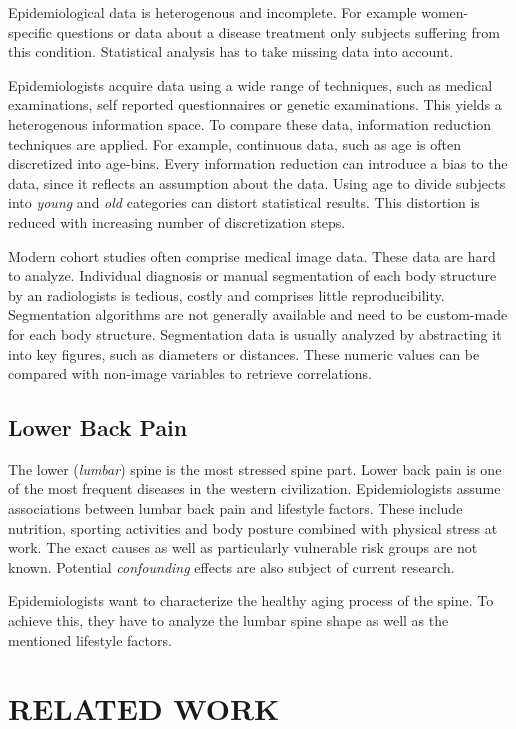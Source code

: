 \documentclass[a4paper,twoside]{style/article}
\begin{document}
Epidemiological data is heterogenous and incomplete.
For example women-specific questions or data about a disease treatment only subjects suffering from this condition.
Statistical analysis has to take missing data into account.

Epidemiologists acquire data using a wide range of techniques, such as medical examinations, self reported questionnaires or genetic examinations.
This yields a heterogenous information space.
To compare these data, information reduction techniques are applied.
For example, continuous data, such as age is often discretized into age-bins.
Every information reduction can introduce a bias to the data, since it reflects an assumption about the data.
Using age to divide subjects into \emph{young} and \emph{old} categories can distort statistical results.
This distortion is reduced with increasing number of discretization steps.

Modern cohort studies often comprise medical image data.
These data are hard to analyze.
Individual diagnosis or manual segmentation of each body structure by an radiologists is tedious, costly and comprises little reproducibility.
Segmentation algorithms are not generally available and need to be custom-made for each body structure.
Segmentation data is usually analyzed by abstracting it into key figures, such as diameters or distances.
These numeric values can be compared with non-image variables to retrieve correlations.
\subsection{Lower Back Pain}
The lower (\emph{lumbar}) spine is the most stressed spine part.
Lower back pain is one of the most frequent diseases in the western civilization.
Epidemiologists assume associations between lumbar back pain and lifestyle factors.
These include nutrition, sporting activities and body posture combined with physical stress at work.
The exact causes as well as particularly vulnerable risk groups are not known.
Potential \emph{confounding} effects are also subject of current research.

Epidemiologists want to characterize the healthy aging process of the spine.
To achieve this, they have to analyze the lumbar spine shape as well as the mentioned lifestyle factors.
\section{\uppercase{Related Work}}
\label{sec:RelatedWork}
\end{document}
